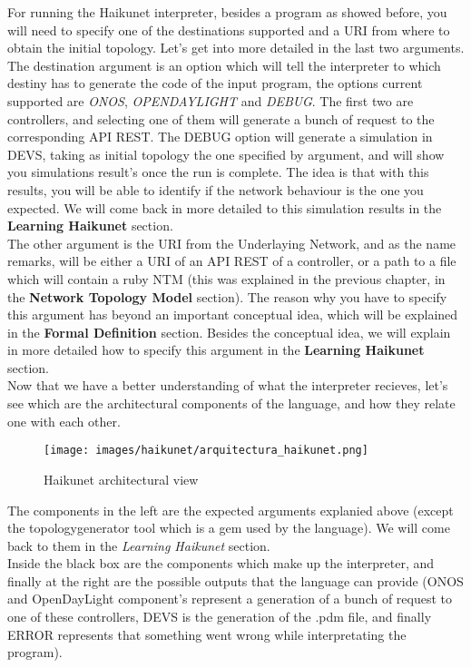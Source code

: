 For running the Haikunet interpreter, besides a program as showed before, you will need to specify one of the destinations supported and a URI from where to obtain the initial topology. Let's get into more detailed in the last two arguments.\\
The destination argument is an option which will tell the interpreter to which destiny has to generate the code of the input program, the options current supported are \textit{ONOS}, \textit{OPENDAYLIGHT} and \textit{DEBUG}. The first two are controllers, and selecting one of them will generate a bunch of request to the corresponding API REST. The DEBUG option will generate a simulation in DEVS, taking as initial topology the one specified by argument, and will show you simulations result's once the run is complete. The idea is that with this results, you will be able to identify if the network behaviour is the one you expected. We will come back in more detailed to this simulation results in the \textbf{Learning Haikunet} section.\\
The other argument is the URI from the Underlaying Network, and as the name remarks, will be either a URI of an API REST of a controller, or a path to a file which will contain a ruby NTM (this was explained in the previous chapter, in the \textbf{Network Topology Model} section). The reason why you have to specify this argument has beyond an important conceptual idea, which will be explained in the \textbf{Formal Definition} section. Besides the conceptual idea, we will explain in more detailed how to specify this argument in the \textbf{Learning Haikunet} section.\\

Now that we have a better understanding of what the interpreter recieves, let's see which are the architectural components of the language, and how they relate one with each other.

\begin{figure}[H]
\centering
\texttt{[image: images/haikunet/arquitectura\_haikunet.png]}
\caption{Haikunet architectural view}
\end{figure}

The components in the left are the expected arguments explanied above (except the topologygenerator tool which is a gem used by the language). We will come back to them in the \textit{Learning Haikunet} section.\\
Inside the black box are the components which make up the interpreter, and finally at the right are the possible outputs that the language can provide (ONOS and OpenDayLight component's represent a generation of a bunch of request to one of these controllers, DEVS is the generation of the .pdm file, and finally ERROR represents that something went wrong while interpretating the program).\\

